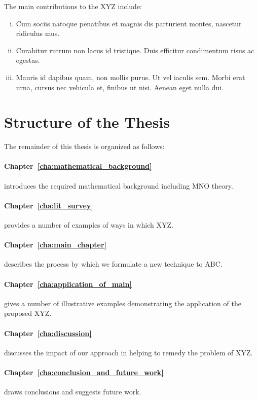 The main contributions to the XYZ include:
\begin{enumerate}[(i)]
	\item Cum sociis natoque penatibus et magnis dis parturient montes, nascetur ridiculus mus.
	\item Curabitur rutrum non lacus id tristique. Duis efficitur condimentum risus ac egestas.
	\item  Mauris id dapibus quam, non mollis purus. Ut vel iaculis sem. Morbi erat urna, cursus nec vehicula et, finibus ut nisi. Aenean eget nulla dui.
\end{enumerate}


\section{Structure of the Thesis}
\label{sec:structure_of_the_thesis}

The remainder of this thesis is organized as follows:

\paragraph{Chapter~\ref{cha:mathematical_background}} introduces the required mathematical background including MNO theory.

\paragraph{Chapter~\ref{cha:lit_survey}} provides a number of examples of ways in which XYZ.

\paragraph{Chapter~\ref{cha:main_chapter}} describes the process by which we formulate a new technique to ABC.

\paragraph{Chapter~\ref{cha:application_of_main}} gives a number of illustrative examples demonstrating the application of the proposed XYZ.

\paragraph{Chapter~\ref{cha:discussion}} discusses the impact of our approach in helping to remedy the problem of XYZ.

\paragraph{Chapter~\ref{cha:conclusion_and_future_work}} draws conclusions and suggests future work.

